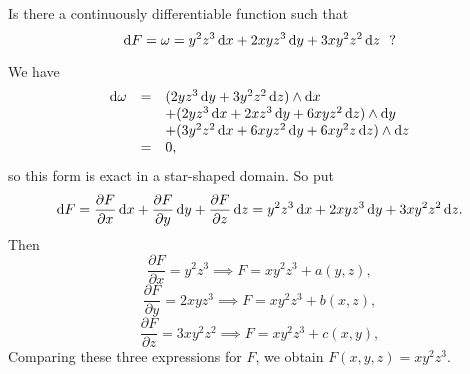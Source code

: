 \begin{exa}
Is there a continuously differentiable function such that $$ \d{F}
= \omega = y^2z^3 \d{x} + 2xyz^3\d{y} + 3xy^2z^2\d{z}\ \ ?
$$
\end{exa}
\begin{solu} We have $$\begin{array}{lll}\d{\omega} &  = & (2yz^3\d{y} +
3y^2z^2\d{z})\wedge \d{x} \\ & &  + (2yz^3\d{x} + 2xz^3\d{y} +
6xyz^2\d{z})\wedge \d{y} \\ & & +
(3y^2z^2\d{x} + 6xyz^2\d{y} + 6xy^2z\d{z})\wedge\d{z} \\
&  = &  0, \end{array}$$ so this form is exact in a star-shaped
domain. So put $$ \d{F} =  \frac{\partial F}{\partial x}\d{x} +
\frac{\partial F}{\partial y}\d{y} + \frac{\partial F}{\partial
z}\d{z} = y^2z^3 \d{x} + 2xyz^3\d{y} + 3xy^2z^2\d{z}.
$$Then $$\frac{\partial F}{\partial x} = y^2z^3 \implies F = xy^2z^3 + a(y,z), $$
$$\frac{\partial F}{\partial y} =  2xyz^3\implies F = xy^2z^3 + b(x,z), $$
$$\frac{\partial F}{\partial z} = 3xy^2z^2 \implies F = xy^2z^3 + c(x,y), $$
Comparing these three expressions for $F$, we obtain $F(x,y,z) =
xy^2z^3$.
\end{solu}













